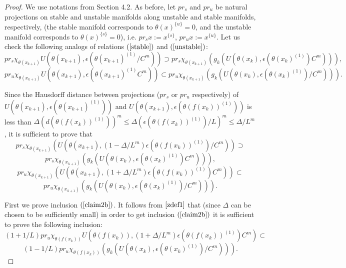 \documentclass[11pt]{article}
\theoremstyle{Mystyle}
\begin{document}
\begin{proof}
We use notations from Section 4.2.
As before, let $pr_s$ and $pr_u$ be natural projections on stable and unstable manifolds along unstable and stable manifolds, respectively, (the stable manifold corresponds to $\theta(x)^{\{u\}} = 0$, and the unstable manifold corresponds to $\theta(x)^{\{s\}} = 0$), i.e. $pr_s x:= x^{\{s\}}$, $pr_u x := x^{\{u\}}$.
Let us check the following analogs of relations $(\ref{stable})$ and $(\ref{unstable})$:
\begin{equation}
\label{claim3a}
pr_s \chi_{\theta(x_{k+1})} U(\theta(x_{k+1}),\epsilon(\theta(x_{k+1})^{(1)}/C^m))\supset pr_s \chi_{\theta(x_{k+1})} (g_k(U(\theta(x_k),\epsilon(\theta(x_k)^{(1)})C^m))),
\end{equation}
\begin{equation}
\label{claim3b} 
pr_u \chi_{\theta(x_{k+1})} U(\theta(x_{k+1}),\epsilon(\theta(x_{k+1})^{(1)}C^m))\subset pr_u \chi_{\theta(x_{k+1})} (g_k(U(\theta(x_k),\epsilon(\theta(x_k)^{(1)})/C^m))).
\end{equation}

Since the Hausdorff distance between projections ($pr_s$ or $pr_u$ respectively) of $U(\theta(x_{k+1}),\epsilon(\theta(x_{k+1})^{(1)}))$  and $U(\theta(x_{k+1}),\epsilon(\theta(f(x_k))^{(1)}))$
is less than $\Delta(d(\theta(f(x_k))^{(1)}))^m\leq\Delta(\epsilon(\theta(f(x_k))^{(1)})/L)^m\leq \Delta/L^m$, it is sufficient to prove that
$$
pr_s \chi_{\theta(x_{k+1})}(U(\theta(x_{k+1}),(1-\Delta/L^m)\epsilon(\theta(f(x_k))^{(1)})/C^m))\supset
$$
\begin{equation} 
\label{claim2a} pr_s \chi_{\theta(x_{k+1})}(g_k(U(\theta(x_k),\epsilon(\theta(x_k)^{(1)})C^m))),
\end{equation}
$$
pr_u \chi_{\theta(x_{k+1})} (U(\theta(x_{k+1}),(1+\Delta/L^m)\epsilon(\theta(f(x_k))^{(1)})C^m))\subset
$$
\begin{equation}
\label{claim2b} 
 pr_u \chi_{\theta(x_{k+1})}(g_k(U(\theta(x_k),\epsilon(\theta(x_k)^{(1)})/C^m))).
\end{equation}



First we prove inclusion $(\ref{claim2b})$. 
It follows from $\eqref{zdef1}$ that (since $\Delta$ can be chosen to be sufficiently small) in order to get inclusion $(\ref{claim2b})$ it is sufficient to prove the following inclusion:
$$
(1+1/L)pr_u \chi_{\theta(f(x_k))} U(\theta(f(x_k)),(1+\Delta/L^m)\epsilon(\theta(f(x_k))^{(1)})C^m)\subset
$$ 
\begin{equation}
\label{claim2balt}
(1-1/L)pr_u \chi_{\theta(f(x_k))}(g_k(U(\theta(x_k),\epsilon(\theta(x_k)^{(1)})/C^m))).
\end{equation}


\end{proof}
\end{document}
